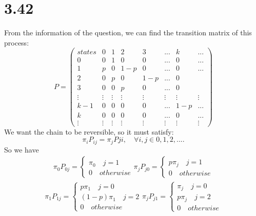 \documentclass{article}
\begin{document}
\section{3.42}
From the information of the question, we can find the transition matrix of this process:
\begin{equation*}
    P=
    \begin{pmatrix}
    states&0&1&2&3&...&k&...\\
    0&0&1&0&0&...&0&...\\
    1&p&0&1-p&0&...&0&...\\
    2&0&p&0&1-p&...&0\\
    3&0&0&p&0&...&0\\
    \vdots&\vdots&\vdots&\vdots&\vdots&\vdots&\vdots&\vdots\\
    k-1&0&0&0&0&...&1-p&...\\
    k&0&0&0&0&...&0&...\\
    \vdots&\vdots&\vdots&\vdots&\vdots&\vdots&\vdots&\vdots
    \end{pmatrix}
\end{equation*}
We want the chain to be reversible, so it must satisfy:
\begin{equation*}
    \pi_i P_{ij} = \pi_j P{ji}, \quad \forall i,j \in {0, 1, 2, ...}.
\end{equation*}
So we have
\begin{align*}
    \pi_0 P_{0j} = 
    \begin{cases}
    \pi_0 \quad j=1 \\
    0 \quad otherwise
    \end{cases}
    \pi_j P_{j0} = 
    \begin{cases}
    p\pi_j \quad j=1 \\
    0 \quad otherwise
    \end{cases}
\end{align*}
\begin{align*}
    \pi_1 P_{1j} = 
    \begin{cases}
    p\pi_1 \quad j=0 \\
    (1-p)\pi_1 \quad j=2 \\
    0 \quad otherwise
    \end{cases}
    \pi_j P_{j1} = 
    \begin{cases}
    \pi_j \quad j=0 \\
    p\pi_j \quad j=2 \\
    0 \quad otherwise
    \end{cases}
\end{align*}
\end{document}
